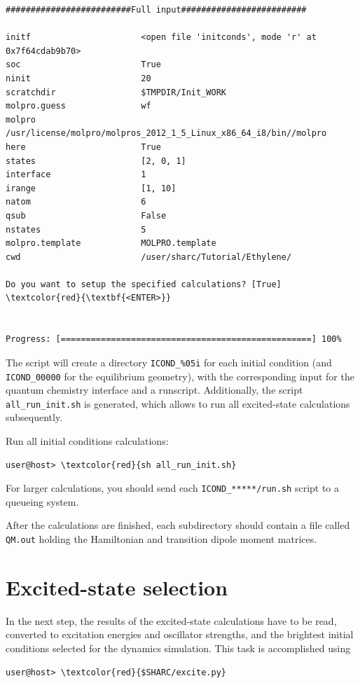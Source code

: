 \documentclass[a4paper,11pt,DIV=15,openany]{scrbook}
\newcommand{\ttt}[1]{\texttt{#1}}
\begin{document}
\begin{oframed}
\begin{Verbatim}[commandchars=\\\{\}]
#########################Full input#########################

initf                      <open file 'initconds', mode 'r' at 0x7f64cdab9b70>
soc                        True
ninit                      20
scratchdir                 $TMPDIR/Init_WORK
molpro.guess               wf
molpro                     /usr/license/molpro/molpros_2012_1_5_Linux_x86_64_i8/bin//molpro
here                       True
states                     [2, 0, 1]
interface                  1
irange                     [1, 10]
natom                      6
qsub                       False
nstates                    5
molpro.template            MOLPRO.template
cwd                        /user/sharc/Tutorial/Ethylene/

Do you want to setup the specified calculations? [True] \textcolor{red}{\textbf{<ENTER>}}


Progress: [==================================================] 100%
\end{Verbatim}
\end{oframed}

\normalsize
The script will create a directory \ttt{ICOND\_\%05i} for each initial condition (and \ttt{ICOND\_00000} for the equilibrium geometry), with the corresponding input for the quantum chemistry interface and a runscript. Additionally, the script \ttt{all\_run\_init.sh} is generated, which allows to run all excited-state calculations subsequently. 

Run all initial conditions calculations:
\begin{Verbatim}[commandchars=\\\{\}]
user@host> \textcolor{red}{sh all_run_init.sh}
\end{Verbatim}
For larger calculations, you should send each \ttt{ICOND\_*****/run.sh} script to a queueing system.

After the calculations are finished, each subdirectory should contain a file called \ttt{QM.out} holding the Hamiltonian and transition dipole moment matrices.


\clearpage
\section{Excited-state selection}

In the next step, the results of the excited-state calculations have to be read, converted to excitation energies and oscillator strengths, and the brightest initial conditions selected for the dynamics simulation. This task is accomplished using 
\begin{Verbatim}[commandchars=\\\{\}]
user@host> \textcolor{red}{$SHARC/excite.py}
\end{Verbatim}
\end{document}
